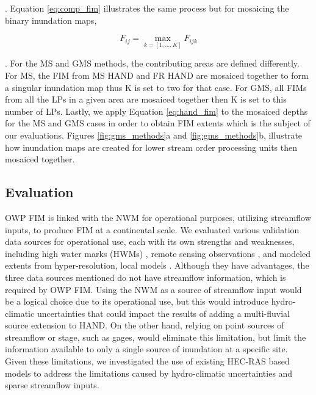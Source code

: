 %
. Equation \ref{eq:comp_fim} illustrates the same process but for mosaicing the binary inundation maps,
%
\begin{linenomath*}
\begin{equation}
\label{eq:comp_fim}
    F_{ij} = \max_{k=[1,...,K]} F_{ijk}
\end{equation}
\end{linenomath*}
. For the MS and GMS methods, the contributing areas are defined differently.
For MS, the FIM from MS HAND and FR HAND are mosaiced together to form a singular inundation map thus K is set to two for that case.
For GMS, all FIMs from all the LPs in a given area are mosaiced together then K is set to this number of LPs.
Lastly, we apply Equation \ref{eq:hand_fim} to the mosaiced depths for the MS and GMS cases in order to obtain FIM extents which is the subject of our evaluations.
Figures \ref{fig:gms_methods}a and \ref{fig:gms_methods}b, illustrate how inundation maps are created for lower stream order processing units then mosaiced together.
%
\subsection{Evaluation}
\label{ssec:evaluation}
%
OWP FIM is linked with the NWM for operational purposes, utilizing streamflow inputs, to produce FIM at a continental scale.
We evaluated various validation data sources for operational use, each with its own strengths and weaknesses, including high water marks (HWMs) \cite{musser2017characterization,watson2017characterization,breaker2016characterization}, remote sensing observations \cite{aristizabal2020high,aristizabal2021mapping}, and modeled extents from hyper-resolution, local models \cite{mcenery2005noaa}.
Although they have advantages, the three data sources mentioned do not have streamflow information, which is required by OWP FIM.
Using the NWM as a source of streamflow input would be a logical choice due to its operational use, but this would introduce hydro-climatic uncertainties that could impact the results of adding a multi-fluvial source extension to HAND.
On the other hand, relying on point sources of streamflow or stage, such as gages, would eliminate this limitation, but limit the information available to only a single source of inundation at a specific site.
Given these limitations, we investigated the use of existing HEC-RAS based models to address the limitations caused by hydro-climatic uncertainties and sparse streamflow inputs.

